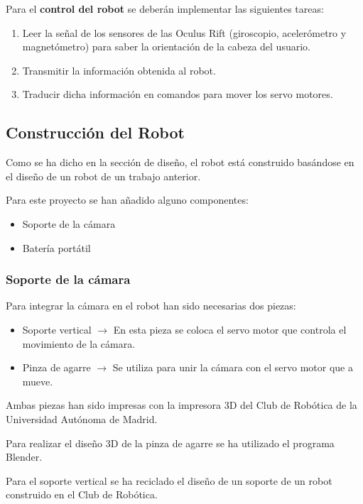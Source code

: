 \documentclass[twoside, 12pt]{epstfg}
\begin{document}
Para el \textbf{control del robot} se deberán implementar las siguientes tareas:

\begin{enumerate}
	\item Leer la señal de los sensores de las Oculus Rift (giroscopio, acelerómetro y magnetómetro) para saber la orientación de la cabeza del usuario.
	
	\item Transmitir la información obtenida al robot.
	
	\item Traducir dicha información en comandos para mover los servo motores.
\end{enumerate} 
\subsection{Construcción del Robot}
Como se ha dicho en la sección de diseño, el robot está construido basándose en el diseño de un robot de un trabajo anterior.

Para este proyecto se han añadido alguno componentes:

\begin{itemize}
	\item Soporte de la cámara
	\item Batería portátil
\end{itemize}

\subsubsection{Soporte de la cámara}

Para integrar la cámara en el robot han sido necesarias dos piezas:

\begin{itemize}
	\item Soporte vertical $\rightarrow$ En esta pieza se coloca el servo motor que controla el movimiento de la cámara.
	
	\item Pinza de agarre $\rightarrow$ Se utiliza para unir la cámara con el servo motor que a mueve.
\end{itemize}

Ambas piezas han sido impresas con la impresora 3D del Club de Robótica de la Universidad Autónoma de Madrid.

Para realizar el diseño 3D de la pinza de agarre se ha utilizado el programa Blender.

Para el soporte vertical se ha reciclado el diseño de un soporte de un robot construido en el Club de Robótica.
\end{document}
